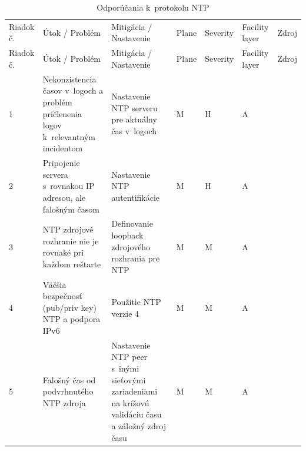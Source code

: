 \newpage
\begin{longtable}[!htbp]{|C{2.5em}L{11em}L{11em}C{2.5em}C{4em}C{5em}L{2.5em}|}
	
	\caption{Odporúčania k~protokolu NTP}
	\label{tab:ntp}\\ \hline
	\mbox{Riadok} č.&Útok / Problém	&Mitigácia / Nastavenie	&Plane	&Severity	&Facility layer	&Zdroj\\ \hhline{=======}
	\endfirsthead 
	\hline
	\centering
	
	Riadok č.	&Útok / Problém	&Mitigácia / Nastavenie	&Plane	&Severity	&Facility layer	&Zdroj\\ \hhline{=======}
	\endhead
	
	 1	&Nekonzistencia časov v~logoch a problém pričlenenia logov k~relevantným incidentom	&Nastavenie NTP serveru pre aktuálny čas v~logoch	&M	&H	&A	& \cite{Jackson2010}
	
	\cite{Singh2018}
	
	\cite{CIS_DrTLsgXv24lxeIIM}\\
	2	&Pripojenie servera s~rovnakou IP adresou, ale falošným časom	&Nastavenie NTP autentifikácie	&M	&H	&A	& \cite{Jackson2010}
	
	\cite{Singh2018}
	
	\cite{CIS_DrTLsgXv24lxeIIM}\\
	 3	&NTP zdrojové rozhranie nie je rovnaké pri každom reštarte	& Definovanie loopback zdrojového rozhrania pre NTP	&M	&M	&A	& \cite{Jackson2010}
	
	\cite{Singh2018}
	
	\cite{CIS_DrTLsgXv24lxeIIM}\\
	4	&Väčšia bezpečnosť (pub/priv key) NTP a podpora IPv6	&Použitie NTP verzie 4	&M	&M	&A	&\cite{s0goWNnWp5OjqREE}\\
	 5	&Falošný čas od podvrhnutého NTP zdroja	&Nastavenie NTP peer s~inými sieťovými zariadeniami na krížovú validáciu času a záložný zdroj času	&M	&M	&A	& \cite{Akin2002}\\
	\hline
\end{longtable}%


